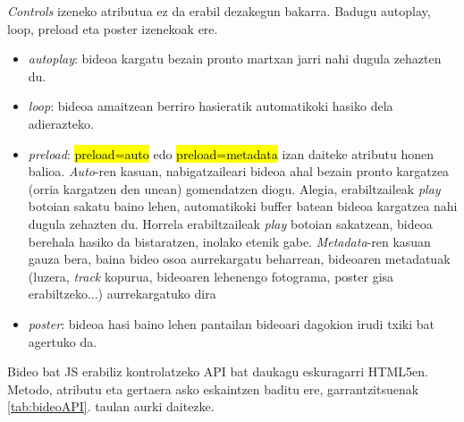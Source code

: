 \textit{Controls} izeneko atributua ez da erabil dezakegun bakarra. Badugu autoplay, loop, preload eta poster izenekoak ere.

\begin{itemize}
    \item \textit{autoplay}: bideoa kargatu bezain pronto martxan jarri nahi dugula zehazten du.
    \item \textit{loop}: bideoa amaitzean berriro hasieratik automatikoki hasiko dela adierazteko.
    \item \textit{preload}: \hl{preload=auto} edo \hl{preload=metadata} izan daiteke atributu honen balioa. \textit{Auto}-ren kasuan, nabigatzaileari bideoa ahal bezain pronto kargatzea (orria kargatzen den unean) gomendatzen diogu. Alegia, erabiltzaileak \textit{play} botoian sakatu baino lehen, automatikoki buffer batean bideoa kargatzea nahi dugula zehazten du. Horrela erabiltzaileak \textit{play} botoian sakatzean, bideoa berehala hasiko da bistaratzen, inolako etenik gabe. \textit{Metadata}-ren kasuan gauza bera, baina bideo osoa aurrekargatu beharrean, bideoaren metadatuak (luzera, \textit{track} kopurua, bideoaren lehenengo fotograma, poster gisa erabiltzeko...) aurrekargatuko dira
   \item \textit{poster}: bideoa hasi baino lehen pantailan bideoari dagokion irudi txiki bat agertuko da.
\end{itemize}

Bideo bat JS erabiliz kontrolatzeko API bat daukagu eskuragarri HTML5en. Metodo, atributu eta gertaera asko eskaintzen baditu ere, garrantzitsuenak \ref{tab:bideoAPI}. taulan aurki daitezke.


